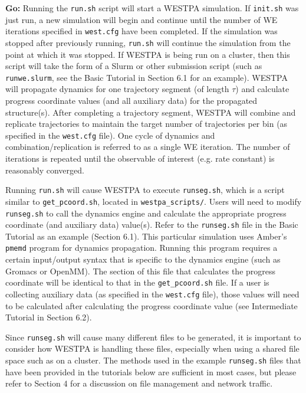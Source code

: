 \documentclass[9pt,tutorial,ASAPversion]{livecoms}
\begin{document}
\textbf{Go:} Running the \verb|run.sh| script will start a WESTPA simulation. 
If \verb|init.sh| was just run, a new simulation will begin and continue until the number of WE iterations specified in \verb|west.cfg| have been completed. 
If the simulation was stopped after previously running, \verb|run.sh| will continue the simulation from the point at which it was stopped. 
If WESTPA is being run on a cluster, then this script will take the form of a Slurm or other submission script (such as \verb|runwe.slurm|, see the Basic Tutorial in Section 6.1 for an example). 
WESTPA will propagate dynamics for one trajectory segment (of length $\tau$) and calculate progress coordinate values (and all auxiliary data) for the propagated structure(s). 
After completing a trajectory segment, WESTPA will combine and replicate trajectories to maintain the target number of trajectories per bin (as specified in the \verb|west.cfg| file). 
One cycle of dynamics and combination/replication is referred to as a single WE iteration. 
The number of iterations is repeated until the observable of interest (e.g. rate constant) is reasonably converged.

Running \verb|run.sh| will cause WESTPA to execute \verb|runseg.sh|, which is a script similar to \verb|get_pcoord.sh|, located in \verb|westpa_scripts/|. 
Users will need to modify \verb|runseg.sh| to call the dynamics engine and calculate the appropriate progress coordinate (and auxiliary data) value(s). 
Refer to the \verb|runseg.sh| file in the Basic Tutorial as an example (Section 6.1). 
This particular simulation uses Amber’s \verb|pmemd| program for dynamics propagation. 
Running this program requires a certain input/output syntax that is specific to the dynamics engine (such as Gromacs or OpenMM). 
The section of this file that calculates the progress coordinate will be identical to that in the \verb|get_pcoord.sh| file. If a user is collecting auxiliary data (as specified in the \verb|west.cfg| file), those values will need to be calculated after calculating the progress coordinate value (see Intermediate Tutorial in Section 6.2).

Since \verb|runseg.sh| will cause many different files to be generated, it is important to consider how WESTPA is handling these files, especially when using a shared file space such as on a cluster. 
The methods used in the example \verb|runseg.sh| files that have been provided in the tutorials below are sufficient in most cases, but please refer to Section 4 for a discussion on file management and network traffic.
\end{document}
